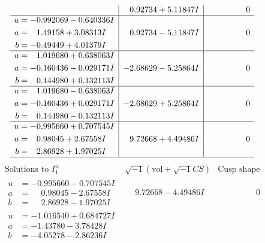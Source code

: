 \documentclass[1p]{elsarticle_modified}
\theoremstyle{definition}
\newcommand{\I}{\sqrt{-1}}
\begin{document}
$$\begin{array}{c|c|c}
 & \phantom{-}0.92734 + 5.11847 I & \phantom{-0.000000 } 0 \\ \hline\begin{aligned}
u &= -0.992069 - 0.640336 I \\
a &= \phantom{-}1.49158 + 3.08313 I \\
b &= -0.49449 + 4.01379 I\end{aligned}
 & \phantom{-}0.92734 - 5.11847 I & \phantom{-0.000000 } 0 \\ \hline\begin{aligned}
u &= \phantom{-}1.019680 + 0.638063 I \\
a &= -0.160436 - 0.029171 I \\
b &= \phantom{-}0.144980 + 0.132113 I\end{aligned}
 & -2.68629 - 5.25864 I & \phantom{-0.000000 } 0 \\ \hline\begin{aligned}
u &= \phantom{-}1.019680 - 0.638063 I \\
a &= -0.160436 + 0.029171 I \\
b &= \phantom{-}0.144980 - 0.132113 I\end{aligned}
 & -2.68629 + 5.25864 I & \phantom{-0.000000 } 0 \\ \hline\begin{aligned}
u &= -0.995660 + 0.707545 I \\
a &= \phantom{-}0.98045 + 2.67558 I \\
b &= \phantom{-}2.86928 + 1.97025 I\end{aligned}
 & \phantom{-}9.72668 + 4.49486 I & \phantom{-0.000000 } 0\\
 \hline 
 \end{array}$$\newpage$$\begin{array}{c|c|c}  
\text{Solutions to }I^u_{1}& \I (\text{vol} + \sqrt{-1}CS) & \text{Cusp shape}\\
 \hline 
\begin{aligned}
u &= -0.995660 - 0.707545 I \\
a &= \phantom{-}0.98045 - 2.67558 I \\
b &= \phantom{-}2.86928 - 1.97025 I\end{aligned}
 & \phantom{-}9.72668 - 4.49486 I & \phantom{-0.000000 } 0 \\ \hline\begin{aligned}
u &= -1.016540 + 0.684727 I \\
a &= -1.43780 - 3.78428 I \\
b &= -4.05278 - 2.86236 I\end{aligned}

\end{array}$$
\end{document}
